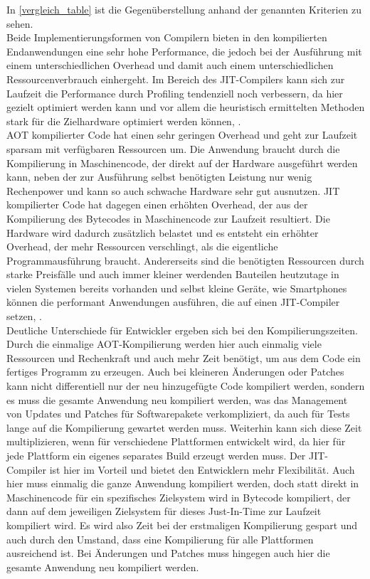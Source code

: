 In \autoref{vergleich_table} ist die Gegenüberstellung anhand der genannten Kriterien zu sehen. \\
Beide Implementierungsformen von Compilern bieten in den kompilierten Endanwendungen eine sehr hohe Performance, die jedoch bei der Ausführung mit einem unterschiedlichen Overhead und damit auch einem unterschiedlichen Ressourcenverbrauch einhergeht. Im Bereich des \ac{JIT}-Compilers kann sich zur Laufzeit die Performance durch Profiling tendenziell noch verbessern, da hier gezielt optimiert werden kann und vor allem die heuristisch ermittelten Methoden stark für die Zielhardware optimiert werden können, \cite[vgl. Wade, Kulkarni, 2017, S.9]{wade_kulkarni_jantz_2017}. \\
\ac{AOT} kompilierter Code hat einen sehr geringen Overhead und geht zur Laufzeit sparsam mit verfügbaren Ressourcen um. Die Anwendung braucht durch die Kompilierung in Maschinencode, der direkt auf der Hardware ausgeführt werden kann, neben der zur Ausführung selbst benötigten Leistung nur wenig Rechenpower und kann so auch schwache Hardware sehr gut ausnutzen. 
\ac{JIT} kompilierter Code hat dagegen einen erhöhten Overhead, der aus der Kompilierung des Bytecodes in Maschinencode zur Laufzeit resultiert. Die Hardware wird dadurch zusätzlich belastet und es entsteht ein erhöhter Overhead, der mehr Ressourcen verschlingt, als die eigentliche Programmausführung braucht. Andererseits sind die benötigten Ressourcen durch starke Preisfälle und auch immer kleiner werdenden Bauteilen heutzutage in vielen Systemen bereits vorhanden und selbst kleine Geräte, wie Smartphones können die performant Anwendungen ausführen, die auf einen \ac{JIT}-Compiler setzen, \cite[vgl. Wade, Kulkarni, 2017, S.1]{wade_kulkarni_jantz_2017}. \\
Deutliche Unterschiede für Entwickler ergeben sich bei den Kompilierungszeiten. 
Durch die einmalige \ac{AOT}-Kompilierung werden hier auch einmalig viele Ressourcen und Rechenkraft und auch mehr Zeit benötigt, um aus dem Code ein fertiges Programm zu erzeugen. Auch bei kleineren Änderungen oder Patches kann nicht differentiell nur der neu hinzugefügte Code kompiliert werden, sondern es muss die gesamte Anwendung neu kompiliert werden, was das Management von Updates und Patches für Softwarepakete verkompliziert, da auch für Tests lange auf die Kompilierung gewartet werden muss. Weiterhin kann sich diese Zeit multiplizieren, wenn für verschiedene Plattformen entwickelt wird, da hier für jede Plattform ein eigenes separates Build erzeugt werden muss. 
Der \ac{JIT}-Compiler ist hier im Vorteil und bietet den Entwicklern mehr Flexibilität. Auch hier muss einmalig die ganze Anwendung kompiliert werden, doch statt direkt in Maschinencode für ein spezifisches Zielsystem wird in Bytecode kompiliert, der dann auf dem jeweiligen Zielsystem für dieses Just-In-Time zur Laufzeit kompiliert wird. Es wird also Zeit bei der erstmaligen Kompilierung gespart und auch durch den Umstand, dass eine Kompilierung für alle Plattformen ausreichend ist. Bei Änderungen und Patches muss hingegen auch hier die gesamte Anwendung neu kompiliert werden.\\

